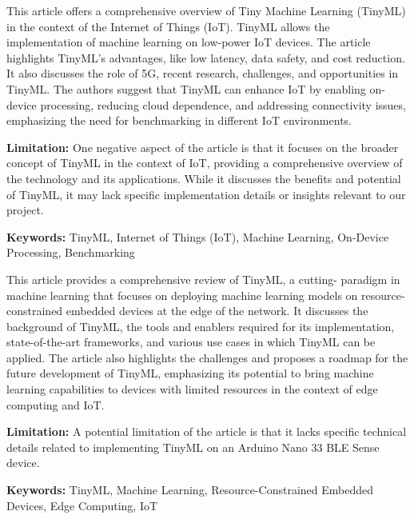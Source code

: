 { 
	This article \cite{Dutta:2021} offers a comprehensive overview of Tiny Machine Learning (TinyML) in the context of the Internet of Things (IoT). TinyML allows the implementation of machine learning on low-power IoT devices. The article highlights TinyML's advantages, like low latency, data safety, and cost reduction. It also discusses the role of 5G, recent research, challenges, and opportunities in TinyML. The authors suggest that TinyML can enhance IoT by enabling on-device processing, reducing cloud dependence, and addressing connectivity issues, emphasizing the need for benchmarking in different IoT environments.
	
	\bigskip
	
	\textbf{Limitation:} One negative aspect of the article is that it focuses on the broader concept of TinyML in the context of IoT, providing a comprehensive overview of the technology and its applications. While it discusses the benefits and potential of TinyML, it may lack specific implementation details or insights relevant to our project.
	
	\scriptsize{\textbf{Keywords:} TinyML, Internet of Things (IoT), Machine Learning, On-Device Processing, Benchmarking}
}


{ 
	This article \cite{Ray:2022} provides a comprehensive review of TinyML, a cutting- paradigm in machine learning that focuses on deploying machine learning models on resource-constrained embedded devices at the edge of the network. It discusses the background of TinyML, the tools and enablers required for its implementation, state-of-the-art frameworks, and various use cases in which TinyML can be applied. The article also highlights the challenges and proposes a roadmap for the future development of TinyML, emphasizing its potential to bring machine learning capabilities to devices with limited resources in the context of edge computing and IoT.
	
	\bigskip
	
	\textbf{Limitation:} A potential limitation of the article is that it lacks specific technical details related to implementing TinyML on an Arduino Nano 33 BLE Sense device.
	
	\scriptsize{\textbf{Keywords:} TinyML, Machine Learning, Resource-Constrained Embedded Devices, Edge Computing, IoT}
}


